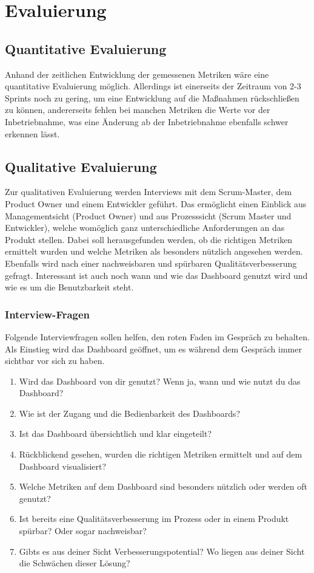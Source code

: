 \chapter{Evaluierung}

\section{Quantitative Evaluierung}

Anhand der zeitlichen Entwicklung der gemessenen Metriken wäre eine quantitative Evaluierung möglich.
Allerdings ist einerseits der Zeitraum von 2{-}3 Sprints noch zu gering, um eine Entwicklung auf die Maßnahmen rückschließen zu können,
andererseits fehlen bei manchen Metriken die Werte vor der Inbetriebnahme, was eine Änderung ab der Inbetriebnahme ebenfalls schwer erkennen lässt.

\clearpage
\section{Qualitative Evaluierung}

Zur qualitativen Evaluierung werden Interviews mit dem Scrum-Master, dem Product Owner und einem Entwickler geführt.
Das ermöglicht einen Einblick aus Managementsicht (Product Owner) und aus Prozesssicht (Scrum Master und Entwickler), welche womöglich ganz unterschiedliche Anforderungen an das Produkt stellen.
Dabei soll herausgefunden werden, ob die richtigen Metriken ermittelt wurden und welche Metriken als besonders nützlich angesehen werden.
Ebenfalls wird nach einer nachweisbaren und spürbaren Qualitätsverbesserung gefragt.
Interessant ist auch noch wann und wie das Dashboard genutzt wird und wie es um die Benutzbarkeit steht.

\subsection{Interview-Fragen}

Folgende Interviewfragen sollen helfen, den roten Faden im Gespräch zu behalten.
Als Einstieg wird das Dashboard geöffnet, um es während dem Gespräch immer sichtbar vor sich zu haben.

\begin{enumerate}
    \item Wird das Dashboard von dir genutzt? Wenn ja, wann und wie nutzt du das Dashboard?
    \item Wie ist der Zugang und die Bedienbarkeit des Dashboards?
    \item Ist das Dashboard übersichtlich und klar eingeteilt?
    \item Rückblickend gesehen, wurden die richtigen Metriken ermittelt und auf dem Dashboard visualisiert?
    \item Welche Metriken auf dem Dashboard sind besonders nützlich oder werden oft genutzt?
    \item Ist bereits eine Qualitätsverbesserung im Prozess oder in einem Produkt spürbar? Oder sogar nachweisbar?
    \item Gibts es aus deiner Sicht Verbesserungspotential? Wo liegen aus deiner Sicht die Schwächen dieser Lösung?
\end{enumerate}

